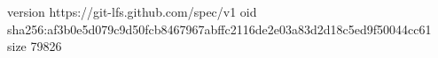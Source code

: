 version https://git-lfs.github.com/spec/v1
oid sha256:af3b0e5d079c9d50fcb8467967abffc2116de2e03a83d2d18c5ed9f50044cc61
size 79826
